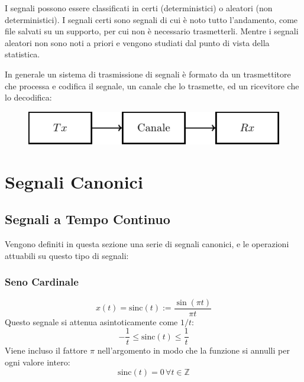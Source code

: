 \documentclass{article}
\newcommand{\sinc}{\mathrm{sinc}}
\numberwithin{equation}{subsection}
\begin{document}
I segnali possono essere classificati in certi (deterministici) o aleatori (non deterministici). I segnali certi sono segnali di cui è noto tutto l'andamento, come file salvati su un supporto, per cui non è necessario 
trasmetterli. Mentre i segnali aleatori non sono noti a priori e vengono studiati dal punto di vista della statistica. 

In generale un sistema di trasmissione di segnali è formato da un trasmettitore che processa e codifica il segnale, un canale che lo trasmette, ed un ricevitore che lo decodifica:
\begin{figure}[H]%
    \centering
    \includegraphics{canale-trasmissione.pdf}%
    \label{fig:canale-trasmissione}
\end{figure}

\clearpage

\section{Segnali Canonici}

\subsection{Segnali a Tempo Continuo}

Vengono definiti in questa sezione una serie di segnali canonici, e le operazioni attuabili su questo tipo di segnali:

\subsubsection{Seno Cardinale}

\begin{equation}
    x(t)=\sinc(t):=\displaystyle\frac{\sin(\pi t)}{\pi t}
\end{equation}
Questo segnale si attenua asintoticamente come $1/t$: 
\begin{equation*}
    \displaystyle-\frac{1}{t}\leq\sinc(t)\leq\frac{1}{t}
\end{equation*}
Viene incluso il fattore $\pi$ nell'argomento in modo che la funzione si annulli per ogni valore intero:
\begin{equation*}
    \sinc(t)=0\,\forall t\in\mathbb{Z}
\end{equation*}
\end{document}
